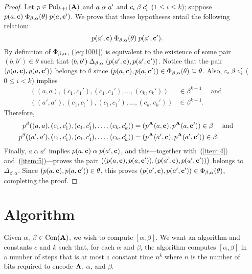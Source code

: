 \begin{proof}
    Let $p \in \operatorname{Pol}_{k+1}(\mathbf{A})$ and $a \mathrel{\alpha} a'$ and $c_i \mathrel{\beta} c_i'$ ($1\leq i\leq k$);
    suppose $p(a, \mathbf{c}) \mathrel{\Phi_{\beta, \alpha}(\theta)} p(a, \mathbf{c}')$.
    We prove that these hypotheses entail the following relation:
    \begin{equation}
      \label{eq:1001}
      p(a', \mathbf{c}) \mathrel{\Phi_{\beta, \alpha}(\theta)} p(a', \mathbf{c}').
    \end{equation}
    By definition of $\Phi_{\beta, \alpha}$, (\ref{eq:1001}) 
    is equivalent to the existence of
    some pair $(b,b') \in \theta$ such that
    $(b,b') \mathrel{\Delta_{\beta, \alpha}} (p(a', \mathbf{c}), p(a', \mathbf{c}'))$.
    Notice that the pair $(p(a, \mathbf{c}), p(a, \mathbf{c}'))$
    belongs to $\theta$ since
    $(p(a, \mathbf{c}), p(a, \mathbf{c}')) \in \Phi_{\beta, \alpha}(\theta) \subseteq \theta$.  Also,
    $c_i \mathrel{\beta} c_i'$ ($0\leq i<k$) implies
    \begin{align*}
    ((a,a), (c_1, c_1'), (c_1, c_1'), \dots, (c_{k}, c_{k}'))&\in \beta^{k+1} \quad \text{ and }\\
    ((a',a'), (c_1, c_1'), (c_1, c_1'), \dots, (c_{k}, c_{k}')) &\in \beta^{k+1}.
    \end{align*}
    Therefore,
    \begin{align}
      \label{item:4}
    p^{\beta}((a,a), (c_1, c_1'), (c_1, c_1'), \dots, (c_{k}, c_{k}'))
    &= (p^{\mathbf{A}}(a, \mathbf{c}), p^{\mathbf{A}}(a, \mathbf{c}')) \in \beta  \quad \text{ and }\\
    \label{item:5}
    p^{\beta}((a',a'), (c_1, c_1'), (c_1, c_1'), \dots, (c_{k}, c_{k}'))
    &= (p^{\mathbf{A}}(a', \mathbf{c}), p^{\mathbf{A}}(a', \mathbf{c}')) \in \beta.
    \end{align}
    Finally, $a\mathrel{\alpha} a'$ implies $p(a, \mathbf{c}) \mathrel{\alpha} p(a', \mathbf{c})$, and this---together
    with~(\ref{item:4}) and~(\ref{item:5})---proves the pair
    $\bigl((p(a, \mathbf{c}), p(a, \mathbf{c}')), (p(a', \mathbf{c}), p(a', \mathbf{c}'))\bigr)$
    belongs to  $\mathrel{\Delta_{\beta, \alpha}}$.
    Since  $(p(a, \mathbf{c}), p(a, \mathbf{c}')) \in \theta$, this proves
    $(p(a', \mathbf{c}), p(a', \mathbf{c}')) \in \Phi_{\beta, \alpha}(\theta)$, completing the proof.
  \end{proof}

\bigskip

\section{Algorithm}
Given $\alpha$, $\beta \in \operatorname{Con}(\mathbf{A})$, we wish to compute $[\alpha, \beta]$.
We want an algorithm and constants $c$ and $k$ such that, for each
$\alpha$ and $\beta$, the algorithm computes $[\alpha, \beta]$
in a number of steps that is at most a constant time $n^k$
where $n$ is the number of bits required to encode
$\mathbf{A}$, $\alpha$, and $\beta$.

